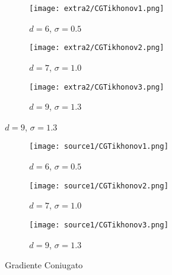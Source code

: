 \documentclass{article}
\begin{document}
\begin{figure}[h]
     \begin{subfigure}{0.3\textwidth}
    \texttt{[image: extra2/CGTikhonov1.png]}
    \caption{$d=6$, $\sigma=0.5$}
    \label{fig:first}
\end{subfigure}%
\hfill
 \begin{subfigure}{0.3\textwidth}
    \texttt{[image: extra2/CGTikhonov2.png]}
        \caption{$d=7$, $\sigma=1.0$}
    \label{fig:second}
\end{subfigure}%
\hfill
 \begin{subfigure}{0.3\textwidth}
    \texttt{[image: extra2/CGTikhonov3.png]}
        \caption{$d=9$, $\sigma=1.3$}
    \label{fig:third}
\end{subfigure}

\label{fig:figures}
\end{figure}

\begin{figure}[h]
\begin{subfigure}{0.25\textwidth}
    \texttt{[image: source1/CGTikhonov1.png]}
    \caption{$d=6$, $\sigma=0.5$}
    \label{fig:first}
\end{subfigure}%
    \hfill
\begin{subfigure}{0.25\textwidth}
    \texttt{[image: source1/CGTikhonov2.png]}
        \caption{$d=7$, $\sigma=1.0$}
    \label{fig:second}
\end{subfigure}%
\hfill
\begin{subfigure}{0.25\textwidth}
    \texttt{[image: source1/CGTikhonov3.png]}
        \caption{$d=9$, $\sigma=1.3$}
    \label{fig:third}
\end{subfigure}
\caption{Gradiente Coniugato}
\label{fig:figures}
\end{figure}
\end{document}
